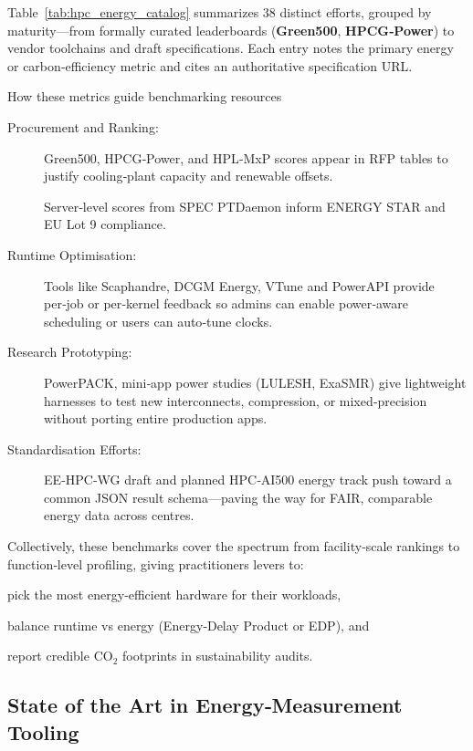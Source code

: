 Table~\ref{tab:hpc_energy_catalog} summarizes 38 distinct efforts, grouped by maturity—from formally curated leaderboards (\textbf{Green500}, \textbf{HPCG‑Power}) to vendor toolchains and draft specifications.  Each entry notes the primary energy or carbon‑efficiency metric and cites an authoritative specification URL.

How these metrics guide benchmarking resources 

\begin{description}
\item[Procurement and Ranking:]

Green500, HPCG‑Power, and HPL‑MxP scores appear in RFP tables to justify cooling‑plant capacity and renewable offsets.

Server‑level scores from SPEC PTDaemon inform ENERGY STAR and EU Lot 9 compliance.


\item[Runtime Optimisation:]
Tools like Scaphandre, DCGM Energy, VTune and PowerAPI provide per‑job or per‑kernel feedback so admins can enable power‑aware scheduling or users can auto‑tune clocks.

\item[Research Prototyping:]
PowerPACK, mini‑app power studies (LULESH, ExaSMR) give lightweight harnesses to test new interconnects, compression, or mixed‑precision without porting entire production apps.

\item[Standardisation Efforts:]
EE‑HPC‑WG draft and planned HPC‑AI500 energy track push toward a common JSON result schema—paving the way for FAIR, comparable energy data across centres.

\end{description}

Collectively, these benchmarks cover the spectrum from facility‑scale rankings to function‑level profiling, giving practitioners levers to:

pick the most energy‑efficient hardware for their workloads,

balance runtime vs energy (Energy‑Delay Product or EDP), and

report credible CO$_2$ footprints in sustainability audits.




\subsection{State of the Art in Energy‑Measurement Tooling}
\label{sec:energy:tooling}

